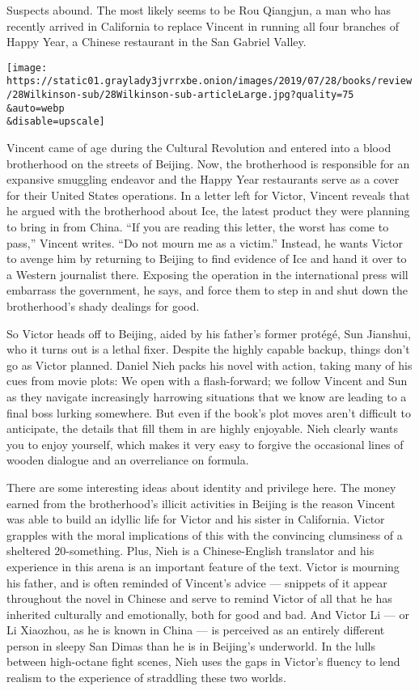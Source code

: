 Suspects abound. The most likely seems to be Rou Qiangjun, a man who has
recently arrived in California to replace Vincent in running all four
branches of Happy Year, a Chinese restaurant in the San Gabriel Valley.

\texttt{[image: https://static01.graylady3jvrrxbe.onion/images/2019/07/28/books/review/28Wilkinson-sub/28Wilkinson-sub-articleLarge.jpg?quality=75\\\&auto=webp\\\&disable=upscale]}

Vincent came of age during the Cultural Revolution and entered into a
blood brotherhood on the streets of Beijing. Now, the brotherhood is
responsible for an expansive smuggling endeavor and the Happy Year
restaurants serve as a cover for their United States operations. In a
letter left for Victor, Vincent reveals that he argued with the
brotherhood about Ice, the latest product they were planning to bring in
from China. ``If you are reading this letter, the worst has come to
pass,'' Vincent writes. ``Do not mourn me as a victim.'' Instead, he
wants Victor to avenge him by returning to Beijing to find evidence of
Ice and hand it over to a Western journalist there. Exposing the
operation in the international press will embarrass the government, he
says, and force them to step in and shut down the brotherhood's shady
dealings for good.

So Victor heads off to Beijing, aided by his father's former protégé,
Sun Jianshui, who it turns out is a lethal fixer. Despite the highly
capable backup, things don't go as Victor planned. Daniel Nieh packs his
novel with action, taking many of his cues from movie plots: We open
with a flash-forward; we follow Vincent and Sun as they navigate
increasingly harrowing situations that we know are leading to a final
boss lurking somewhere. But even if the book's plot moves aren't
difficult to anticipate, the details that fill them in are highly
enjoyable. Nieh clearly wants you to enjoy yourself, which makes it very
easy to forgive the occasional lines of wooden dialogue and an
overreliance on formula.

There are some interesting ideas about identity and privilege here. The
money earned from the brotherhood's illicit activities in Beijing is the
reason Vincent was able to build an idyllic life for Victor and his
sister in California. Victor grapples with the moral implications of
this with the convincing clumsiness of a sheltered 20-something. Plus,
Nieh is a Chinese-English translator and his experience in this arena is
an important feature of the text. Victor is mourning his father, and is
often reminded of Vincent's advice --- snippets of it appear throughout
the novel in Chinese and serve to remind Victor of all that he has
inherited culturally and emotionally, both for good and bad. And Victor
Li --- or Li Xiaozhou, as he is known in China --- is perceived as an
entirely different person in sleepy San Dimas than he is in Beijing's
underworld. In the lulls between high-octane fight scenes, Nieh uses the
gaps in Victor's fluency to lend realism to the experience of straddling
these two worlds.

